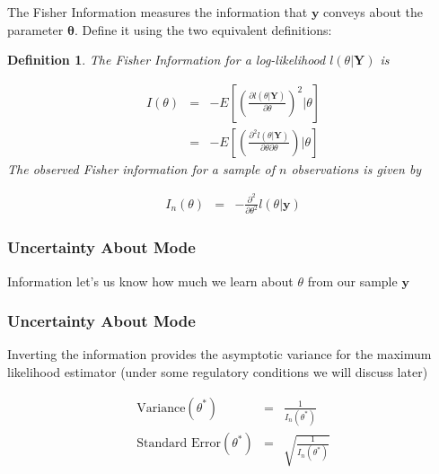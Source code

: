 \documentclass{beamer}
\newtheorem{defn}{Definition}
\begin{document}
\begin{frame}

The \alert{Fisher Information} measures the information that $\boldsymbol{y}$ conveys about the parameter $\boldsymbol{\theta}$.  Define it using the two equivalent definitions:

\begin{defn}
The \alert{Fisher Information} for a log-likelihood $l(\theta|\boldsymbol{Y})$ is

\begin{eqnarray}
I(\theta) & = & -E\left[\left(\frac{\partial l(\theta|\boldsymbol{Y})}{\partial \theta }\right)^2 | \theta \right] \nonumber \\
& = & -E\left[\left(\frac{\partial^2 l(\theta|\boldsymbol{Y})}{\partial \theta \partial \theta }\right) | \theta \right] \nonumber
\end{eqnarray}
The \alert{observed Fisher information} for a sample of $n$ observations is given by

\begin{eqnarray}
I_{n}(\theta) & = & - \frac{\partial^2}{\partial \theta^2} l(\theta|\boldsymbol{y} ) \nonumber
\end{eqnarray}


\end{defn}



\end{frame}



\begin{frame}
\frametitle{Uncertainty About Mode}

Information let's us know how much we learn about $\theta$ from our sample $\boldsymbol{y}$ \pause

\begin{itemize}
 \pause
{}
\end{itemize}


\end{frame}

\begin{frame}
\frametitle{Uncertainty About Mode}

Inverting the information provides the asymptotic variance for the maximum likelihood estimator (under some regulatory conditions we will discuss later)

\begin{eqnarray}
\text{Variance} (\theta^{*}) & = & \frac{1}{I_{n}(\theta^{*})} \nonumber \\
\text{Standard Error}(\theta^{*}) & = & \sqrt{\frac{1}{I_{n}(\theta^{*})}} \nonumber
\end{eqnarray}


\end{frame}
\end{document}
